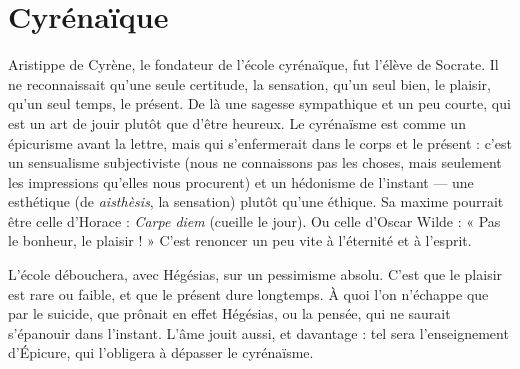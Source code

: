 \section{Cyrénaïque}
Aristippe de Cyrène, le fondateur de l’école cyrénaïque, fut
l'élève de Socrate. Il ne reconnaissait qu’une seule certitude,
la sensation, qu’un seul bien, le plaisir, qu’un seul temps, le présent. De
là une sagesse sympathique et un peu courte, qui est un art de jouir plutôt que
d’être heureux. Le cyrénaïsme est comme un épicurisme avant la lettre, mais
qui s’enfermerait dans le corps et le présent : c’est un sensualisme subjectiviste
(nous ne connaissons pas les choses, mais seulement les impressions qu’elles
nous procurent) et un hédonisme de l’instant — une esthétique (de {\it aisthèsis}, la
sensation) plutôt qu’une éthique. Sa maxime pourrait être celle d’Horace :
{\it Carpe diem} (cueille le jour). Ou celle d’Oscar Wilde : « Pas le bonheur, le
plaisir ! » C’est renoncer un peu vite à l'éternité et à l’esprit.

L'école débouchera, avec Hégésias, sur un pessimisme absolu. C’est que le
plaisir est rare ou faible, et que le présent dure longtemps. À quoi l’on
n'échappe que par le suicide, que prônait en effet Hégésias, ou la pensée, qui
ne saurait s'épanouir dans l'instant. L'âme jouit aussi, et davantage : tel sera
l’enseignement d’Épicure, qui l’obligera à dépasser le cyrénaïsme.

